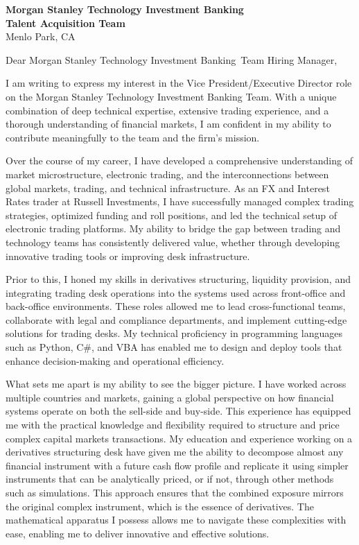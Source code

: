 \documentclass{letter}
\newcommand{\company}{Morgan Stanley Technology Investment Banking}
\begin{document}
\begin{letter}{\textbf{\company\ \\Talent Acquisition Team} \\                
    Menlo Park, CA }

\opening{Dear \company\ Team Hiring Manager,}


I am writing to express my interest in the Vice President/Executive Director role on the Morgan Stanley Technology Investment Banking Team. With a unique combination of deep technical expertise, extensive trading experience, and a thorough understanding of financial markets, I am confident in my ability to contribute meaningfully to the team and the firm's mission.

Over the course of my career, I have developed a comprehensive understanding of market microstructure, electronic trading, and the interconnections between global markets, trading, and technical infrastructure. As an FX and Interest Rates trader at Russell Investments, I have successfully managed complex trading strategies, optimized funding and roll positions, and led the technical setup of electronic trading platforms. My ability to bridge the gap between trading and technology teams has consistently delivered value, whether through developing innovative trading tools or improving desk infrastructure.

Prior to this, I honed my skills in derivatives structuring, liquidity provision, and integrating trading desk operations into the systems used across front-office and back-office environments. These roles allowed me to lead cross-functional teams, collaborate with legal and compliance departments, and implement cutting-edge solutions for trading desks. My technical proficiency in programming languages such as Python, C\#, and VBA has enabled me to design and deploy tools that enhance decision-making and operational efficiency.

What sets me apart is my ability to see the bigger picture. I have worked across multiple countries and markets, gaining a global perspective on how financial systems operate on both the sell-side and buy-side. This experience has equipped me with the practical knowledge and flexibility required to structure and price complex capital markets transactions. My education and experience working on a derivatives structuring desk have given me the ability to decompose almost any financial instrument with a future cash flow profile and replicate it using simpler instruments that can be analytically priced, or if not, through other methods such as simulations. This approach ensures that the combined exposure mirrors the original complex instrument, which is the essence of derivatives. The mathematical apparatus I possess allows me to navigate these complexities with ease, enabling me to deliver innovative and effective solutions.


\end{letter}
\end{document}
